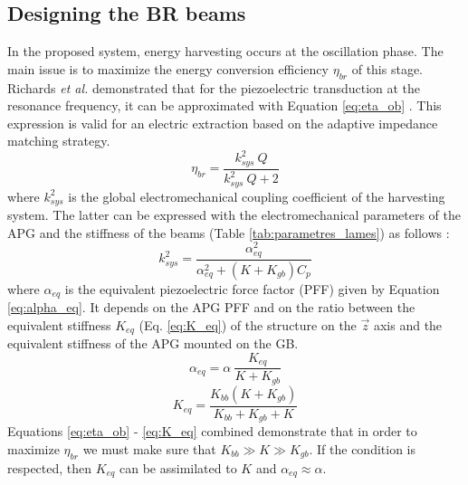 \documentclass[3p,twocolumn,preprint]{elsarticle}
\begin{document}
	\subsection{Designing the BR beams}	
	\label{subsec:BR beams design}
In the proposed system, energy harvesting occurs at the oscillation phase. The main issue is to maximize the energy conversion efficiency $\eta_{br}$ of this stage. Richards \emph{et al.} demonstrated that for the piezoelectric transduction at the resonance frequency, it can be approximated with Equation \ref{eq:eta_ob} \cite{Richards2004}. This expression is valid for an electric extraction based on the adaptive impedance matching strategy.
\begin{equation}
	\eta_{br} = \dfrac{k^2_{sys}\ Q}{k^2_{sys}\ Q + 2}
	\label{eq:eta_ob}
\end{equation}
where $k^2_{sys}$ is the global electromechanical coupling coefficient of the harvesting system. The latter can be expressed with the electromechanical parameters of the APG and the stiffness of the beams (Table \ref{tab:parametres_lames}) as follows :
\begin{equation}
	k^2_{sys} = \dfrac{\alpha^2_{eq}}{\alpha^2_{eq} + (K+K_{gb})C_p}
	\label{eq:k2_sys}
\end{equation}
where $\alpha_{eq}$ is the equivalent piezoelectric force factor (PFF) given by Equation \ref{eq:alpha_eq}. It depends on the APG PFF and on the ratio between the equivalent stiffness $K_{eq}$ (Eq. \ref{eq:K_eq}) of the structure on the $\vec{z}$ axis and the equivalent stiffness of the APG mounted on the GB.
\begin{equation}
	\alpha_{eq} = \alpha\ \dfrac{K_{eq}}{K + K_{gb}} 
	\label{eq:alpha_eq}
\end{equation}
\begin{equation}
	K_{eq} = \dfrac{K_{bb}(K + K_{gb})}{K_{bb} + K_{gb} + K}
	\label{eq:K_eq}
\end{equation}
Equations \ref{eq:eta_ob} - \ref{eq:K_eq} combined demonstrate that in order to maximize $\eta_{br}$ we must make sure that $K_{bb} \gg K \gg K_{gb}$. If the condition is respected, then $K_{eq}$ can be assimilated to $K$ and $\alpha_{eq} \approx \alpha$.
\end{document}
